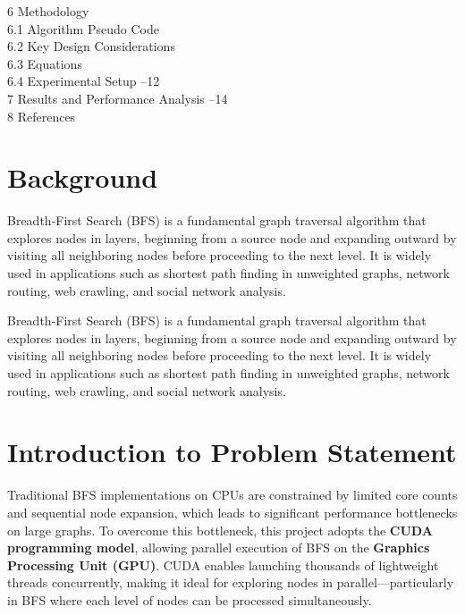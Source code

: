 \documentclass[a4paper,12pt]{article}
\begin{document}
\begin{center}
6 \hspace{1em} Methodology  \\
\hspace{2em} 6.1 Algorithm Pseudo Code  \\
\hspace{2em} 6.2 Key Design Considerations  \\
\hspace{2em} 6.3 Equations  \\
\hspace{2em} 6.4 Experimental Setup –12 \\

7 \hspace{1em} Results and Performance Analysis –14 \\
8 \hspace{1em} References  \\
\newpage
\section*{ Background}

Breadth-First Search (BFS) is a fundamental graph traversal algorithm that explores nodes in layers, beginning from a source node and expanding outward by visiting all neighboring nodes before proceeding to the next level. It is widely used in applications such as shortest path finding in unweighted graphs, network routing, web crawling, and social network analysis.

Breadth-First Search (BFS) is a fundamental graph traversal algorithm that explores nodes in layers, beginning from a source node and expanding outward by visiting all neighboring nodes before proceeding to the next level. It is widely used in applications such as shortest path finding in unweighted graphs, network routing, web crawling, and social network analysis.


\section*{ Introduction to Problem Statement}

Traditional BFS implementations on CPUs are constrained by limited core counts and sequential node expansion, which leads to significant performance bottlenecks on large graphs. To overcome this bottleneck, this project adopts the \textbf{CUDA programming model}, allowing parallel execution of BFS on the \textbf{Graphics Processing Unit (GPU)}. CUDA enables launching thousands of lightweight threads concurrently, making it ideal for exploring nodes in parallel---particularly in BFS where each level of nodes can be processed simultaneously.


\end{center}
\end{document}
